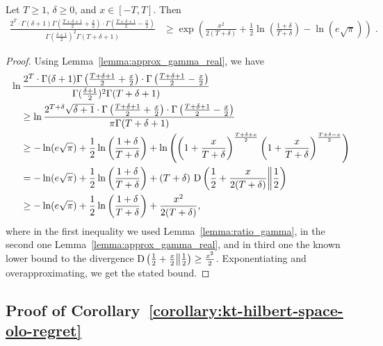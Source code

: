 \begin{lemma}
\label{lemma:lower_bound_gamma}
Let $T \ge 1$, $\delta \ge 0$, and $x \in [-T,T]$. Then
\begin{align*}
\frac{2^T \cdot \Gamma(\delta+1) \Gamma \left(\frac{T+\delta+1}{2} + \frac{x}{2} \right) \cdot \Gamma \left(\frac{T+\delta+1}{2} - \frac{x}{2} \right)}{ \Gamma(\frac{\delta+1}{2})^2 \Gamma(T+\delta+1)}
&\geq\exp\left(\frac{x^2}{2(T+\delta)} +\frac{1}{2} \ln \left(\frac{1+\delta}{T+\delta}\right) - \ln(e \sqrt{\pi})\right) \;.
\end{align*}
\end{lemma}
%
\begin{proof}
Using Lemma~\ref{lemma:approx_gamma_real}, we have
\begin{align*}
&\ln \frac{2^T \cdot \Gamma(\delta+1) \Gamma \left(\frac{T+\delta+1}{2} + \frac{x}{2} \right) \cdot \Gamma \left(\frac{T+\delta+1}{2} - \frac{x}{2} \right)}{ \Gamma(\frac{\delta+1}{2})^2 \Gamma(T+\delta+1)} \\
&\quad \geq \ln \frac{2^{T+\delta} \sqrt{\delta+1} \cdot \Gamma \left(\frac{T+\delta+1}{2} + \frac{x}{2} \right) \cdot \Gamma \left(\frac{T+\delta+1}{2} - \frac{x}{2} \right)}{ \pi \Gamma(T+\delta+1)} \\
&\quad \geq -\ln(e \sqrt{\pi}) +\frac{1}{2} \ln\left(\frac{1+\delta}{T+\delta}\right) +\ln \left(\left( 1+\frac{x}{T+\delta} \right)^\frac{T+\delta+x}{2} \left( 1+\frac{x}{T+\delta} \right)^\frac{T+\delta-x}{2}\right) \\
&\quad = -\ln(e \sqrt{\pi}) +\frac{1}{2} \ln\left(\frac{1+\delta}{T+\delta}\right)+ (T+\delta) \, \operatorname{D}\left({\frac{1}{2}+\frac{x}{2(T+\delta)}}\middle\|{\frac{1}{2}}\right) \\
&\quad \geq -\ln(e \sqrt{\pi}) +\frac{1}{2} \ln\left(\frac{1+\delta}{T+\delta}\right)+ \frac{x^2}{2(T+\delta)} ,
\end{align*}
where in the first inequality we used Lemma~\ref{lemma:ratio_gamma}, in the second one Lemma~\ref{lemma:approx_gamma_real}, and in third one the known lower bound to the divergence $\operatorname{D}\left({\frac{1}{2}+\frac{x}{2}}\middle\|{\frac{1}{2}}\right) \geq \frac{x^2}{2}$. Exponentiating and overapproximating, we get the stated bound.
\end{proof}


\subsection{Proof of Corollary~\ref{corollary:kt-hilbert-space-olo-regret}}

